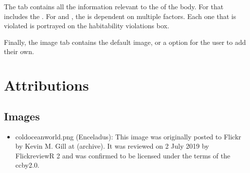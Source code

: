 \documentclass[letterpaper,10pt,english]{sphinxmanual}
\begin{document}
\sphinxAtStartPar
The {\hyperref[\detokenize{quantities/habitability/habitability:id1}]{}} tab contains all the information relevant
to the {\hyperref[\detokenize{quantities/habitability/habitability:id1}]{}} of the body. For {\hyperref[\detokenize{celestial_bodies/star:id1}]{}} that includes
the {\hyperref[\detokenize{quantities/habitability/habitable_zones/habitable_zones:id1}]{}}.
For {\hyperref[\detokenize{celestial_bodies/planet:id1}]{}} and {\hyperref[\detokenize{celestial_bodies/satellite:id1}]{}},
the {\hyperref[\detokenize{quantities/habitability/habitability:id1}]{}} is dependent on multiple factors.
Each one that is violated is portrayed on the habitability violations box.

\sphinxAtStartPar
Finally, the image tab contains the default image, or a option for the user to add their own.


\chapter{Attributions}
\label{\detokenize{attributions/attributions:attributions}}\label{\detokenize{attributions/attributions::doc}}

\section{Images}
\label{\detokenize{attributions/attributions:images}}\label{\detokenize{attributions/attributions:id1}}\begin{itemize}
\item {} 
\sphinxAtStartPar
cold\sphinxhyphen{}ocean\sphinxhyphen{}world.png (Enceladus): This image was originally posted to Flickr by Kevin M. Gill at  (archive). It was reviewed on 2 July 2019 by FlickreviewR 2 and was confirmed to be licensed under the terms of the cc\sphinxhyphen{}by\sphinxhyphen{}2.0.

\end{itemize}



\renewcommand{\indexname}{Index}
\printindex
\end{document}
